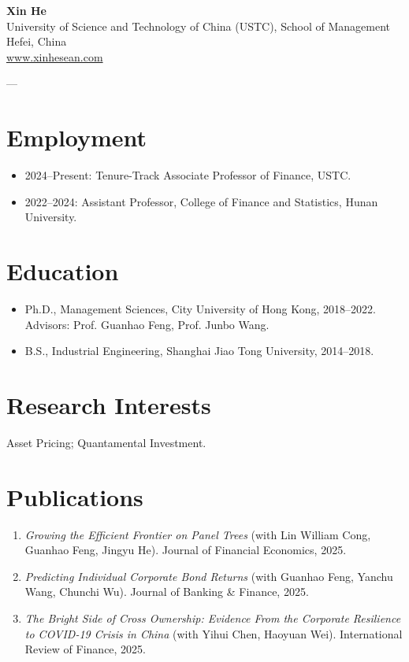 \documentclass[11pt,a4paper]{article}
\begin{document}
\begin{center}
    {\LARGE \textbf{Xin He}} \\[6pt]
    University of Science and Technology of China (USTC), School of Management \\
    Hefei, China \\
    \href{https://www.xinhesean.com}{www.xinhesean.com} \\
\end{center}

---

\section*{Employment}
\begin{itemize}[leftmargin=*]
    \item 2024--Present: Tenure-Track Associate Professor of Finance, USTC.
    \item 2022--2024: Assistant Professor, College of Finance and Statistics, Hunan University.
\end{itemize}

\section*{Education}
\begin{itemize}[leftmargin=*]
    \item Ph.D., Management Sciences, City University of Hong Kong, 2018--2022. Advisors: Prof. Guanhao Feng, Prof. Junbo Wang.
    \item B.S., Industrial Engineering, Shanghai Jiao Tong University, 2014--2018.
\end{itemize}

\section*{Research Interests}
Asset Pricing; Quantamental Investment.

\section*{Publications}
\begin{enumerate}[leftmargin=*]
    \item \emph{Growing the Efficient Frontier on Panel Trees} (with Lin William Cong, Guanhao Feng, Jingyu He). Journal of Financial Economics, 2025.
    \item \emph{Predicting Individual Corporate Bond Returns} (with Guanhao Feng, Yanchu Wang, Chunchi Wu). Journal of Banking \& Finance, 2025.
    \item \emph{The Bright Side of Cross Ownership: Evidence From the Corporate Resilience to COVID-19 Crisis in China} (with Yihui Chen, Haoyuan Wei). International Review of Finance, 2025.
\end{enumerate}
\end{document}
